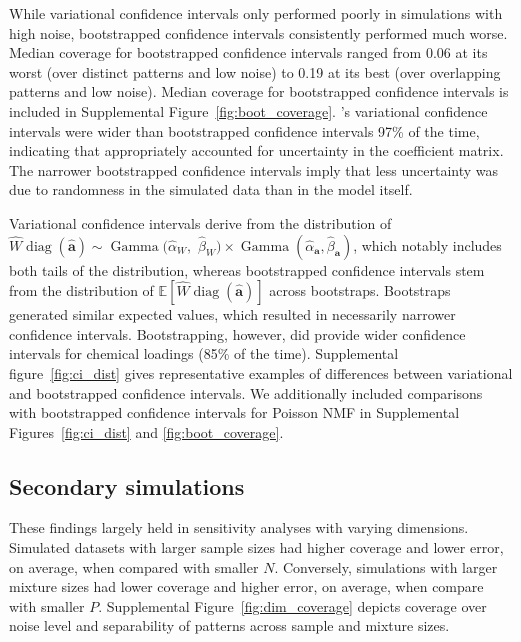 While variational confidence intervals only performed poorly in simulations with high noise, bootstrapped confidence intervals consistently performed much worse. Median coverage for bootstrapped \bnmf confidence intervals ranged from 0.06 at its worst (over distinct patterns and low noise) to 0.19 at its best (over overlapping patterns and low noise). Median coverage for bootstrapped confidence intervals is included in Supplemental Figure~\ref{fig:boot_coverage}. \bnmfc's variational confidence intervals were wider than bootstrapped confidence intervals 97\% of the time, indicating that \bnmf appropriately accounted for uncertainty in the coefficient matrix. The narrower bootstrapped confidence intervals imply that less uncertainty was due to randomness in the simulated data than in the model itself.

Variational confidence intervals derive from the distribution of $\hat{W}\operatorname{diag}(\hat{\mathbf{a}}) \sim \operatorname{Gamma}(\hat{\alpha}_W,$ $\hat{\beta}_W) \times \operatorname{Gamma}(\hat{\alpha}_\mathbf{a}, \hat{\beta}_\mathbf{a})$, which notably includes both tails of the distribution, whereas bootstrapped confidence intervals stem from the distribution of $\mathbb{E}\left[\hat{W}\operatorname{diag}(\hat{\mathbf{a}})\right]$ across bootstraps. Bootstraps generated similar expected values, which resulted in necessarily narrower confidence intervals. Bootstrapping, however, did provide wider confidence intervals for chemical loadings (85\% of the time). Supplemental figure~\ref{fig:ci_dist} gives representative examples of differences between variational and bootstrapped confidence intervals. We additionally included comparisons with bootstrapped confidence intervals for Poisson NMF in Supplemental Figures~\ref{fig:ci_dist} and \ref{fig:boot_coverage}.

\subsection{Secondary simulations}
These findings largely held in sensitivity analyses with varying dimensions. Simulated datasets with larger sample sizes had higher coverage and lower error, on average, when compared with smaller $N$. Conversely, simulations with larger mixture sizes had lower coverage and higher error, on average, when compare with smaller $P$. Supplemental Figure~\ref{fig:dim_coverage} depicts \bnmf coverage over noise level and separability of patterns across sample and mixture sizes.

